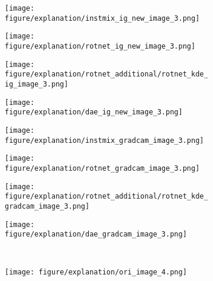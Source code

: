 \documentclass{article} \usepackage{iclr2021_conference,times}
\begin{document}
\begin{figure}[h!]
\begin{subfigure}{.11\textwidth}
\end{subfigure}
\hspace{-2mm}
\begin{subfigure}{.11\textwidth}
  \centering
  \texttt{[image: figure/explanation/instmix\_ig\_new\_image\_3.png]}
\end{subfigure}
\hspace{-2mm}
\begin{subfigure}{.11\textwidth}
  \centering
  \texttt{[image: figure/explanation/rotnet\_ig\_new\_image\_3.png]}
\end{subfigure}
\hspace{-2mm}
\begin{subfigure}{.11\textwidth}
  \centering
  \texttt{[image: figure/explanation/rotnet\_additional/rotnet\_kde\_ig\_image\_3.png]}
\end{subfigure}
\hspace{-2mm}
\begin{subfigure}{.11\textwidth}
  \centering
  \texttt{[image: figure/explanation/dae\_ig\_new\_image\_3.png]}
\end{subfigure}
\hspace{-2mm}
\begin{subfigure}{.11\textwidth}
  \centering
  \texttt{[image: figure/explanation/instmix\_gradcam\_image\_3.png]}
\end{subfigure}
\hspace{-2mm}
\begin{subfigure}{.11\textwidth}
  \centering
  \texttt{[image: figure/explanation/rotnet\_gradcam\_image\_3.png]}
\end{subfigure}
\hspace{-2mm}
\begin{subfigure}{.11\textwidth}
  \centering
  \texttt{[image: figure/explanation/rotnet\_additional/rotnet\_kde\_gradcam\_image\_3.png]}
\end{subfigure}
\hspace{-2mm}
\begin{subfigure}{.11\textwidth}
  \centering
  \texttt{[image: figure/explanation/dae\_gradcam\_image\_3.png]}
\end{subfigure}\\
\begin{subfigure}{.11\textwidth}
  \centering
  \texttt{[image: figure/explanation/ori\_image\_4.png]}
\end{subfigure}
\hspace{-2mm}

\end{figure}
\end{document}
